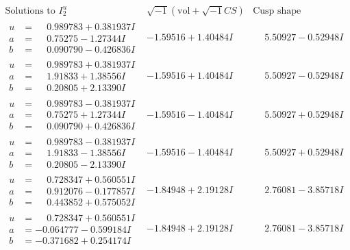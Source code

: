 \documentclass[1p]{elsarticle_modified}
\theoremstyle{definition}
\newcommand{\I}{\sqrt{-1}}
\begin{document}
$$\begin{array}{c|c|c}  
\text{Solutions to }I^u_{2}& \I (\text{vol} + \sqrt{-1}CS) & \text{Cusp shape}\\
 \hline 
\begin{aligned}
u &= \phantom{-}0.989783 + 0.381937 I \\
a &= \phantom{-}0.75275 - 1.27344 I \\
b &= \phantom{-}0.090790 - 0.426836 I\end{aligned}
 & -1.59516 + 1.40484 I & \phantom{-}5.50927 - 0.52948 I \\ \hline\begin{aligned}
u &= \phantom{-}0.989783 + 0.381937 I \\
a &= \phantom{-}1.91833 + 1.38556 I \\
b &= \phantom{-}0.20805 + 2.13390 I\end{aligned}
 & -1.59516 + 1.40484 I & \phantom{-}5.50927 - 0.52948 I \\ \hline\begin{aligned}
u &= \phantom{-}0.989783 - 0.381937 I \\
a &= \phantom{-}0.75275 + 1.27344 I \\
b &= \phantom{-}0.090790 + 0.426836 I\end{aligned}
 & -1.59516 - 1.40484 I & \phantom{-}5.50927 + 0.52948 I \\ \hline\begin{aligned}
u &= \phantom{-}0.989783 - 0.381937 I \\
a &= \phantom{-}1.91833 - 1.38556 I \\
b &= \phantom{-}0.20805 - 2.13390 I\end{aligned}
 & -1.59516 - 1.40484 I & \phantom{-}5.50927 + 0.52948 I \\ \hline\begin{aligned}
u &= \phantom{-}0.728347 + 0.560551 I \\
a &= \phantom{-}0.912076 - 0.177857 I \\
b &= \phantom{-}0.443852 + 0.575052 I\end{aligned}
 & -1.84948 + 2.19128 I & \phantom{-}2.76081 - 3.85718 I \\ \hline\begin{aligned}
u &= \phantom{-}0.728347 + 0.560551 I \\
a &= -0.064777 - 0.599184 I \\
b &= -0.371682 + 0.254174 I\end{aligned}
 & -1.84948 + 2.19128 I & \phantom{-}2.76081 - 3.85718 I \\ \hline\begin{aligned}

\end{aligned}
\end{array}$$
\end{document}
